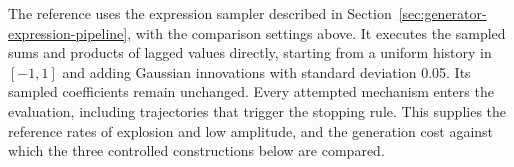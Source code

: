 The reference uses the expression sampler described in
Section~\ref{sec:generator-expression-pipeline}, with the comparison settings
above. It executes the sampled sums and products of lagged values directly,
starting from a uniform history in $[-1,1]$ and adding Gaussian innovations
with standard deviation 0.05. Its sampled coefficients remain unchanged.
Every attempted mechanism enters the evaluation, including trajectories
that trigger the stopping rule. This supplies the reference rates of
explosion and low amplitude, and the generation cost against which the
three controlled constructions below are compared.





